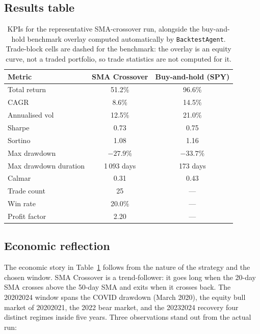 \subsection{Results table}

\begin{table}[ht]
\centering
\small
\renewcommand{\arraystretch}{1.2}
\begin{tabular}{lcc}
\toprule
\textbf{Metric} & \textbf{SMA Crossover} & \textbf{Buy-and-hold (SPY)} \\
\midrule
Total return          & 51.2\%        & 96.6\% \\
CAGR                  & 8.6\%         & 14.5\% \\
Annualised vol        & 12.5\%        & 21.0\% \\
Sharpe                & 0.73          & 0.75 \\
Sortino               & 1.08          & 1.16 \\
Max drawdown          & $-27.9\%$     & $-33.7\%$ \\
Max drawdown duration & 1\,093 days   & 173 days \\
Calmar                & 0.31          & 0.43 \\
Trade count           & 25            & --- \\
Win rate              & 20.0\%        & --- \\
Profit factor         & 2.20          & --- \\
\bottomrule
\end{tabular}
\caption{KPIs for the representative SMA-crossover run, alongside the
buy-and-hold benchmark overlay computed automatically by \texttt{BacktestAgent}.
Trade-block cells are dashed for the benchmark: the overlay is an equity curve,
not a traded portfolio, so trade statistics are not computed for it.}
\label{tab:results}
\end{table}

\subsection{Economic reflection}

The economic story in Table~\ref{tab:results} follows from the nature of the
strategy and the chosen window. SMA Crossover is a trend-follower: it goes long
when the 20-day SMA crosses above the 50-day SMA and exits when it crosses back.
The 2020\textendash{}2024 window spans the COVID drawdown (March 2020), the
equity bull market of 2020\textendash{}2021, the 2022 bear market, and the
2023\textendash{}2024 recovery \textemdash{} four distinct regimes inside five
years. Three observations stand out from the actual run:

